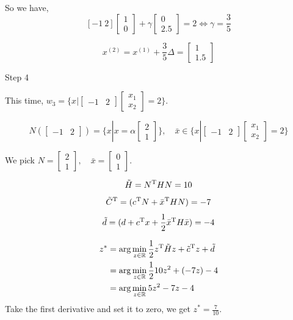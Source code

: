 So we have,
$$[-1\ 2] 
\begin{bmatrix}
1\\
0
\end{bmatrix}
+
\gamma
\begin{bmatrix}
0\\
2.5
\end{bmatrix}
=
2
\Leftrightarrow
\gamma= \frac{3}{5}
$$

$$
x^{(2)} = x^{(1)} +\frac{3}{5} \Delta =
\begin{bmatrix}
1\\
1.5
\end{bmatrix}
$$


Step 4

This time, $w_3 = \{x|
\begin{bmatrix}
-1& 2
\end{bmatrix}
\begin{bmatrix}
x_1\\
x_2
\end{bmatrix}
=2
\}$.

$$N(
\begin{bmatrix}
-1& 2
\end{bmatrix})
=
\{x|x=\alpha
\begin{bmatrix}
2\\
1
\end{bmatrix}\},
\quad
\bar{x}\in 
\{x|
\begin{bmatrix}
-1& 2
\end{bmatrix}
\begin{bmatrix}
x_1\\
x_2
\end{bmatrix}
=2
\}
$$

We pick $N=
\begin{bmatrix}
2\\
1
\end{bmatrix}
,\quad
\bar{x}=
\begin{bmatrix}
0\\
1
\end{bmatrix}
$.

$$\tilde{H} = N^{{\rm T}}HN = 10$$
$$\tilde{C}^{{\rm T}} = (c^{{\rm T}}N + \bar{x}^{{\rm T}} HN)= -7$$
$$\tilde{d}= (d+c^{{\rm T}}x + \frac{1}{2}\bar{x}^{{\rm T}}H\bar{x})=-4$$

\begin{align*}
z^* 
&= \arg\min_{z\in\mathbb{R}} \frac{1}{2} z^{{\rm T}}\tilde{H}z + \tilde{c}^{{\rm T}}z + \tilde{d}\\
&= \arg\min_{z\in\mathbb{R}} \frac{1}{2}10 z^2 + (-7z) - 4\\
&= \arg\min_{z\in\mathbb{R}} 5z^2 - 7z -4
\end{align*}
Take the first derivative and set it to zero, we get $z^* = \frac{7}{10}$.

